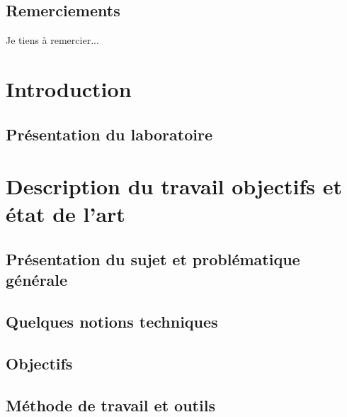 \documentclass[11pt]{report}
\theoremstyle{definition}
\theoremstyle{remark}
\begin{document}
\newpage
\thispagestyle{empty}
\mbox{}

\newpage
\section*{Remerciements}

Je tiens à remercier...
\newpage

\tableofcontents

\newpage

\listoffigures
{}

\newpage

\listoftables
{}

\newpage

\newpage
\chapter{Introduction}
\section{Présentation du laboratoire}


\newpage
\chapter{Description du travail objectifs et état de l'art}
    
    \section{Présentation du sujet et problématique générale}
    
    \newpage
    \section{Quelques notions techniques}
    
    \newpage
    \section{Objectifs}
    
    \newpage
    \section{Méthode de travail et outils}
\end{document}
